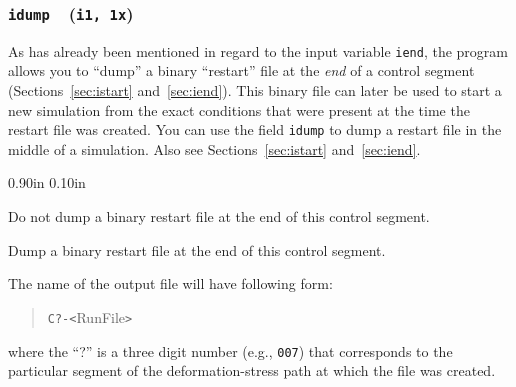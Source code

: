 \documentclass[letterpaper,11pt]{article}
\newcommand{\Var}[2]{\texttt{#1}\ \  (\texttt{#2})}
\newcommand{\RunFile}{\textsf{RunFile}}
\newlength{\Labelwidth}
\newcommand{\Entrylabel}[1]{\makebox[\Labelwidth][r]{\texttt{#1}}}
\newenvironment{Options}
{\begin{list}{}{%
\renewcommand{\makelabel}{\Entrylabel}%
\setlength{\leftmargin} {0.90in}%
\setlength{\rightmargin}{0.00in}%
\setlength{\labelsep}   {0.10in}%
\setlength{\labelwidth} {\Labelwidth}%
}}
{\end{list}}
\begin{document}
\subsubsection[\texttt{idump}]{\Var{idump}{i1, 1x}}\label{sec:idump}
As has already been mentioned in regard to the input variable \texttt{iend},
the program allows you to ``dump'' a binary ``restart'' file at the
\emph{end} of a control segment (Sections~\ref{sec:istart} 
and~\ref{sec:iend}).
This binary file can later be used to start a new simulation from the
exact conditions that were present at the time the restart file was
created.
You can use the field \texttt{idump} to dump a restart file in the
middle of a simulation.
Also see Sections~\ref{sec:istart} and~\ref{sec:iend}.
\begin{Options}
\item[idump=0]
Do not dump a binary restart file at the end of this control segment.
\item[idump=1]
Dump a binary restart file at the end of this control segment.
\end{Options}
The name of the output file will have following form:
\begin{quote}
\texttt{C?-<}\RunFile\texttt{>}
\end{quote}
where the ``?'' is a three digit number (e.g., \texttt{007}) 
that corresponds to the particular
segment of the deformation-stress path at which the file was created.
%
\end{document}
